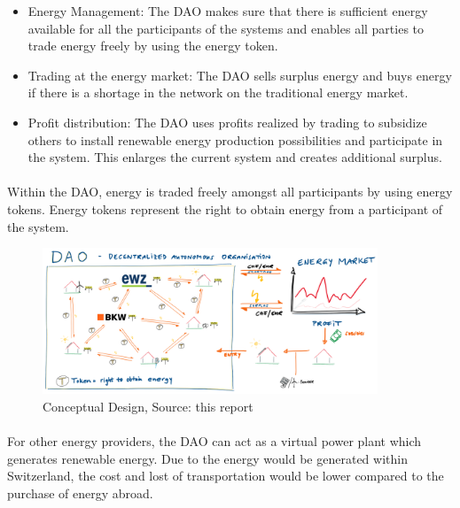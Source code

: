\documentclass{scrartcl}
\begin{document}
	\begin{itemize}
		\item Energy Management: \newline
		The DAO makes sure that there is sufficient energy available for all the participants of the systems and enables all parties to trade energy freely by using the energy token.
		
		\item Trading at the energy market: \newline
		The DAO sells surplus energy and buys energy if there is a shortage in the network on the traditional energy market.
		
		\item Profit distribution: \newline
		The DAO uses profits realized by trading to subsidize others to install renewable energy production possibilities and participate in the system. This enlarges the current system and creates additional surplus.
	\end{itemize}

	\paragraph{}
	Within the DAO, energy is traded freely amongst all participants by using energy tokens. Energy tokens represent the right to obtain energy from a participant of the system.
    
    \begin{figure} [h]
    	\centering
    	\includegraphics[width=100mm,scale=0.5]{03_conceptual_design_picture01.PNG}
    	\caption{Conceptual Design, Source: this report}
    \end{figure}
    
    \paragraph{}
    For other energy providers, the DAO can act as a virtual power plant which generates renewable energy. Due to the energy would be generated within Switzerland, the cost and lost of transportation would be lower compared to the purchase of energy abroad.
    
\end{document}
